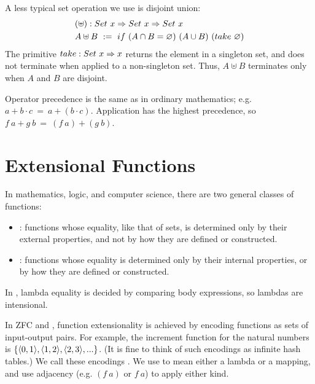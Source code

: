A less typical set operation we use is disjoint union:
\begin{equation}
\begin{aligned}
	&(\uplus) : Set~x \Rightarrow Set~x \Rightarrow Set~x \\
	&A \uplus B \ := \ if~(A \cap B = \varnothing)~(A \cup B)~(take~\varnothing)
\end{aligned}
\end{equation}
The primitive $take : Set~x \Rightarrow x$ returns the element in a singleton set, and does not terminate when applied to a non-singleton set.
Thus, $A \uplus B$ terminates only when $A$ and $B$ are disjoint.

Operator precedence is the same as in ordinary mathematics; e.g. $a + b \cdot c\ =\ a + (b \cdot c)$.
Application has the highest precedence, so $f~a + g~b\ =\ (f~a) + (g~b)$.


\section{Extensional Functions}

In mathematics, logic, and computer science, there are two general classes of functions:
\begin{itemize}
	\item {}: functions whose equality, like that of sets, is determined only by their external properties, and not by how they are defined or constructed.
	\item {}: functions whose equality is determined only by their internal properties, or by how they are defined or constructed.
\end{itemize}
In \lzfclang, lambda equality is decided by comparing body expressions, so lambdas are intensional.

In ZFC and \lzfclang, function extensionality is achieved by encoding functions as sets of input-output pairs.
For example, the increment function for the natural numbers is $\{{\langle{0,1}\rangle,\langle{1,2}\rangle,\langle{2,3}\rangle,...}\}$.
(It is fine to think of such encodings as infinite hash tables.)
We call these encodings .
We use  to mean either a lambda or a mapping, and use adjacency (e.g. $(f~a)$ or $f~a$) to apply either kind.

